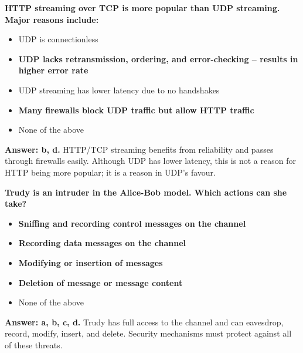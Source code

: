 \begin{tcolorbox}[exambox, title=V24 Q1.5.4 -- HTTP Streaming vs.\ UDP Streaming]
\textbf{HTTP streaming over TCP is more popular than UDP streaming. Major reasons include:}
\begin{itemize}[noitemsep]
  \item[a)] UDP is connectionless
  \item[\textbf{b)}] \textbf{UDP lacks retransmission, ordering, and error-checking -- results in higher error rate} \checkmark
  \item[c)] UDP streaming has lower latency due to no handshakes
  \item[\textbf{d)}] \textbf{Many firewalls block UDP traffic but allow HTTP traffic} \checkmark
  \item[e)] None of the above
\end{itemize}
\textbf{Answer: b, d.} HTTP/TCP streaming benefits from reliability and passes through firewalls easily. Although UDP has lower latency, this is not a reason for HTTP being more popular; it is a reason in UDP's favour.
\end{tcolorbox}

\begin{tcolorbox}[exambox, title=V24 Q1.5.5 -- What Trudy Can Do -- Alice-Bob Model]
\textbf{Trudy is an intruder in the Alice-Bob model. Which actions can she take?}
\begin{itemize}[noitemsep]
  \item[\textbf{a)}] \textbf{Sniffing and recording control messages on the channel} \checkmark
  \item[\textbf{b)}] \textbf{Recording data messages on the channel} \checkmark
  \item[\textbf{c)}] \textbf{Modifying or insertion of messages} \checkmark
  \item[\textbf{d)}] \textbf{Deletion of message or message content} \checkmark
  \item[e)] None of the above
\end{itemize}
\textbf{Answer: a, b, c, d.} Trudy has full access to the channel and can eavesdrop, record, modify, insert, and delete. Security mechanisms must protect against all of these threats.
\end{tcolorbox}


